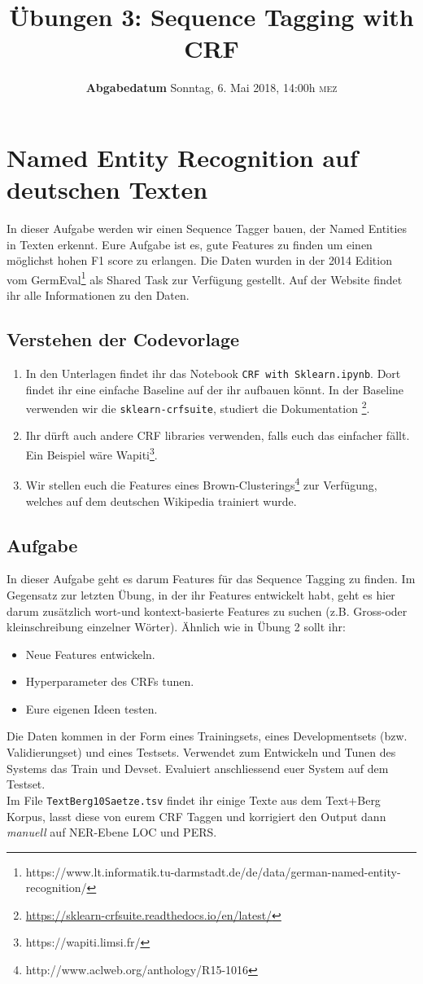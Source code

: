 \documentclass[a4paper,10pt]{article}
\title{Übungen 3: Sequence Tagging with CRF}
\date{\textbf{Abgabedatum} Sonntag, 6. Mai 2018, 14:00h \textsc{mez}
}
\newcommand{\punkte}[1]{(\emph{#1 p})}
\begin{document}
\maketitle


\section{Named Entity Recognition auf deutschen Texten}
In dieser Aufgabe werden wir einen Sequence Tagger bauen, der Named Entities in Texten erkennt. Eure Aufgabe ist es, gute Features zu finden um einen möglichst hohen F1 score zu erlangen. Die Daten wurden in der 2014 Edition vom GermEval\footnote{https://www.lt.informatik.tu-darmstadt.de/de/data/german-named-entity-recognition/} als Shared Task zur Verfügung gestellt. Auf der Website findet ihr alle Informationen zu den Daten.

\subsection{Verstehen der Codevorlage}
\begin{enumerate}
\item In den Unterlagen findet ihr das Notebook \texttt{CRF with Sklearn.ipynb}. Dort findet ihr eine einfache Baseline auf der ihr aufbauen könnt. In der Baseline verwenden wir die \lstinline!sklearn-crfsuite!, studiert die Dokumentation \footnote{\url{https://sklearn-crfsuite.readthedocs.io/en/latest/}}. 
\item Ihr dürft auch andere CRF libraries verwenden, falls euch das einfacher fällt. Ein Beispiel wäre Wapiti\footnote{https://wapiti.limsi.fr/}.
\item Wir stellen euch die Features eines Brown-Clusterings\footnote{http://www.aclweb.org/anthology/R15-1016} zur Verfügung, welches auf dem deutschen Wikipedia trainiert wurde.
\end{enumerate}


\subsection{Aufgabe}
In dieser Aufgabe geht es darum Features für das Sequence Tagging zu finden. Im Gegensatz zur letzten Übung, in der ihr Features entwickelt habt, geht es hier darum zusätzlich wort-und kontext-basierte Features zu suchen (z.B. Gross-oder kleinschreibung einzelner Wörter). Ähnlich wie in Übung 2 sollt ihr:
\begin{itemize}
\item Neue Features entwickeln.
\item Hyperparameter des CRFs tunen.
\item Eure eigenen Ideen testen.
\end{itemize}
Die Daten kommen in der Form eines Trainingsets, eines Developmentsets (bzw. Validierungset) und eines Testsets. Verwendet zum Entwickeln und Tunen des Systems das Train und Devset. Evaluiert anschliessend euer System auf dem Testset. \\
Im File \texttt{TextBerg10Saetze.tsv} findet ihr einige Texte aus dem Text+Berg Korpus, lasst diese von eurem CRF Taggen und korrigiert den Output dann \emph{manuell} auf NER-Ebene LOC und PERS. 
\end{document}

